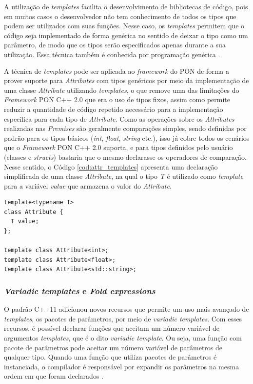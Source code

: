 \FloatBarrier

A utilização de \textit{templates} facilita o desenvolvimento de bibliotecas de
código, pois em muitos casos o desenvolvedor não tem conhecimento de todos os
tipos que podem ser utilizados com suas funções. Nesse caso, os
\textit{templates} permitem que o código seja implementado de forma genérica no
sentido de deixar o tipo como um parâmetro, de modo que os tipos serão
especificados apenas durante a sua utilização. Essa técnica também é conhecida
por programação genérica \cite{stepanov_1998}.

A técnica de \textit{templates} pode ser aplicada ao \textit{framework} do PON
de forma a prover suporte para \textit{Attributes} com tipos genéricos por meio
da implementação de uma classe \textit{Attribute} utilizando \textit{templates},
o que remove uma das limitações do \textit{Framework} PON C++ 2.0 que era o uso
de tipos fixos, assim como permite reduzir a quantidade de código repetido
necessário para a implementação específica para cada tipo de \textit{Attribute}.
Como as operações sobre os \textit{Attributes} realizadas nas \textit{Premises}
são geralmente comparações simples, sendo definidas por padrão para os tipos
básicos (\textit{int}, \textit{float}, \textit{string} etc.), isso já cobre
todos os cenários que o \textit{Framework} PON C++ 2.0 suporta, e para tipos
definidos pelo usuário (classes e \textit{structs}) bastaria que o mesmo
declarasse os operadores de comparação. Nesse sentido, o Código
\ref{cod:attr_templates} apresenta uma declaração simplificada de uma classe
\textit{Attribute}, na qual o tipo \textit{T} é utilizado como \textit{template}
para a variável \textit{value} que armazena o valor do \textit{Attribute}.

\begin{lstlisting}[caption = {\textit{Attribute} com \textit{template}}, float=htb,
  source = {Autoria própria},
  label = {cod:attr_templates}]
template<typename T>
class Attribute {
  T value;
};

template class Attribute<int>;
template class Attribute<float>;
template class Attribute<std::string>;
\end{lstlisting}

\subsubsection{\textit{Variadic templates} e \textit{Fold expressions}}

O padrão C++11 adicionou novos recursos que permite um uso mais avançado de
\textit{templates}, os pacotes de parâmetros, por meio de \textit{variadic
templates}. Com esses recursos, é possível declarar
funções que aceitam um número variável de argumentos \textit{templates}, que é o
dito \textit{variadic template}. Ou seja, uma função com pacote de parâmetros
pode aceitar um número variável de parâmetros de qualquer tipo. Quando uma
função que utiliza pacotes de parâmetros é instanciada, o compilador é
responsável por expandir os parâmetros na mesma ordem em que foram declarados \cite{modern_cpp}.

